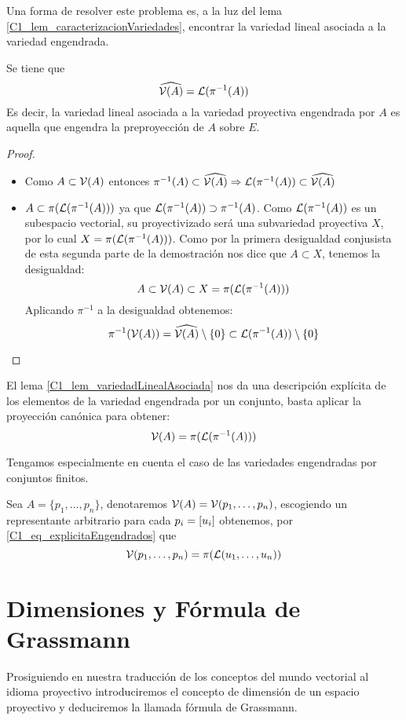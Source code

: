 Una forma de resolver este problema es, a la luz del lema \ref{C1_lem_caracterizacionVariedades}, encontrar la variedad lineal asociada a la variedad engendrada.
\begin{lem}
	\label{C1_lem_variedadLinealAsociada}Se tiene que \[\widehat{\mathcal{V}(A)}=\mathcal{L}(\pi^{-1}(A))\]
	Es decir, la variedad lineal asociada a la variedad proyectiva engendrada por $A$ es aquella que engendra la preproyección de $A$ sobre $E$.
\end{lem}
\begin{proof}\begin{itemize}
		\item[\bsetsub] Como $A\subset\mathcal{V}(A)$ entonces $\pi^{-1}(A)\subset\widehat{\mathcal{V}(A)}\Rightarrow\mathcal{L}(\pi^{-1}(A))\subset\widehat{\mathcal{V}(A)}$
		\item[\bsubset]$A\subset\pi({\mathcal{L}(\pi^{-1}(A))})$ ya que $\mathcal{L}(\pi^{-1}(A))\supset\pi^{-1}(A)$. Como $\mathcal{L}(\pi^{-1}(A))$ es un subespacio vectorial, su proyectivizado será una subvariedad proyectiva $X$, por lo cual $X=\pi({\mathcal{L}(\pi^{-1}(A))})$. Como por la primera desigualdad conjusista de esta segunda parte de la demostración nos dice que $A\subset X$, tenemos la desigualdad: \[A\subset\mathcal{V}(A)\subset X=\pi({\mathcal{L}(\pi^{-1}(A))})\]
		Aplicando $\pi^{-1}$ a la desigualdad obtenemos:
		\[\pi^{-1}(\mathcal{V}(A))=\widehat{\mathcal{V}(A)}\setminus\{0\}\subset\mathcal{L}(\pi^{-1}(A))\setminus\{0\}\]
	\end{itemize}
\end{proof}
El lema \ref{C1_lem_variedadLinealAsociada} nos da una descripción explícita de los elementos de la variedad engendrada por un conjunto, basta aplicar la proyección canónica para obtener:
\begin{equation}\label{C1_eq_explicitaEngendrados}
	\mathcal{V}(A)=\pi(\mathcal{L}(\pi^{-1}(A)))
\end{equation}

Tengamos especialmente en cuenta el caso de las variedades engendradas por conjuntos finitos.
\begin{exa}
	\label{C1_exa_generadoresFinitos}
	Sea $A=\{p_1,\dots,p_n\}$, denotaremos $\mathcal{V}(A)=\mathcal{V}(p_1,\dots,p_n)$, escogiendo un representante arbitrario para cada $p_i=\left [ u_i \right ]$ obtenemos, por \ref{C1_eq_explicitaEngendrados} que
	\[\mathcal{V}(p_1,\dots,p_n)=\pi(\mathcal{L}(u_1,\dots,u_n))\]
\end{exa}
\section{Dimensiones y Fórmula de Grassmann}
Prosiguiendo en nuestra traducción de los conceptos del mundo vectorial al idioma proyectivo introduciremos el concepto de dimensión de un espacio proyectivo y deduciremos la llamada fórmula de Grassmann.

